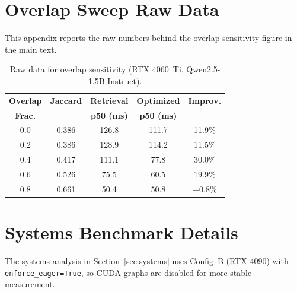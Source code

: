 \documentclass{article}
\begin{document}
\section{Overlap Sweep Raw Data}
\label{app:overlap}

This appendix reports the raw numbers behind the overlap-sensitivity figure in the main text.

\begin{table}[H]
\caption{Raw data for overlap sensitivity (RTX 4060~Ti, Qwen2.5-1.5B-Instruct).}
\label{tab:overlap_raw}
\centering
\footnotesize
\begin{tabular}{@{}ccccc@{}}
\toprule
\textbf{Overlap} & \textbf{Jaccard} & \textbf{Retrieval} & \textbf{Optimized} & \textbf{Improv.} \\
\textbf{Frac.} & & \textbf{p50 (ms)} & \textbf{p50 (ms)} & \\
\midrule
0.0 & 0.386 & 126.8 & 111.7 & 11.9\% \\
0.2 & 0.386 & 128.9 & 114.2 & 11.5\% \\
0.4 & 0.417 & 111.1 & 77.8  & 30.0\% \\
0.6 & 0.526 & 75.5  & 60.5  & 19.9\% \\
0.8 & 0.661 & 50.4  & 50.8  & $-0.8$\% \\
\bottomrule
\end{tabular}
\end{table}


\section{Systems Benchmark Details}
\label{app:v100}

The systems analysis in Section~\ref{sec:systems} uses Config~B (RTX 4090) with \texttt{enforce\_eager=True}, so CUDA graphs are disabled for more stable measurement.



\end{document}
